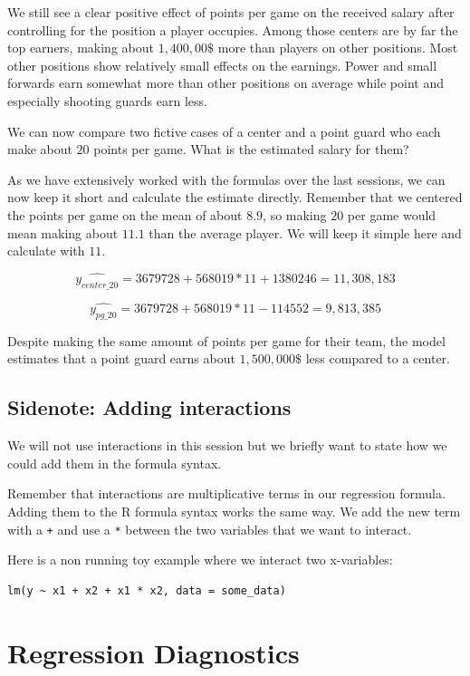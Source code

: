 \documentclass[
]{book}
\begin{document}
We still see a clear positive effect of points per game on the received salary
after controlling for the position a player occupies. Among those centers are by
far the top earners, making about \(1,400,00\$\) more than players on other
positions. Most other positions show relatively small effects on the earnings.
Power and small forwards earn somewhat more than other positions on average
while point and especially shooting guards earn less.

We can now compare two fictive cases of a center and a point guard who each make
about \(20\) points per game. What is the estimated salary for them?

As we have extensively worked with the formulas over the last sessions, we can
now keep it short and calculate the estimate directly. Remember that we
centered the points per game on the mean of about \(8.9\), so making \(20\) per game
would mean making about \(11.1\) than the average player. We will keep it simple
here and calculate with \(11\).

\[\hat{y_{center\_20}} = 3679728 + 568019 * 11 + 1380246 = 11,308,183\]

\[\hat{y_{pg\_20}} = 3679728 + 568019 * 11 - 114552 = 9,813,385\]

Despite making the same amount of points per game for their team, the model
estimates that a point guard earns about \(1,500,000\$\) less compared to a center.

\hypertarget{sidenote-adding-interactions}{%
\subsection{Sidenote: Adding interactions}\label{sidenote-adding-interactions}}

We will not use interactions in this session but we briefly want to state how we
could add them in the formula syntax.

Remember that interactions are multiplicative terms in our regression formula.
Adding them to the R formula syntax works the same way. We add the new term with
a \texttt{+} and use a \texttt{*} between the two variables that we want to interact.

Here is a non running toy example where we interact two x-variables:

\begin{verbatim}
lm(y ~ x1 + x2 + x1 * x2, data = some_data)
\end{verbatim}

\hypertarget{regression-diagnostics-1}{%
\section{Regression Diagnostics}\label{regression-diagnostics-1}}
\end{document}
